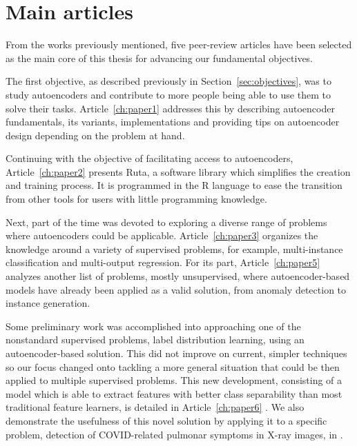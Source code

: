 \clearpage
\section{Main articles}

From the works previously mentioned, five peer-review articles have been selected as the main core of this thesis for advancing our fundamental objectives.

The first objective, as described previously in Section~\ref{sec:objectives}, was to study autoencoders and contribute to more people being able to use them to solve their tasks. Article~\ref{ch:paper1}  addresses this by describing autoencoder fundamentals, its variants, implementations and providing tips on autoencoder design depending on the problem at hand.

Continuing with the objective of facilitating access to autoencoders, Article~\ref{ch:paper2}  presents Ruta, a software library which simplifies the creation and training process. It is programmed in the R language to ease the transition from other tools for users with little programming knowledge.

Next, part of the time was devoted to exploring a diverse range of problems where autoencoders could be applicable. Article~\ref{ch:paper3}  organizes the knowledge around a variety of supervised problems, for example, multi-instance classification and multi-output regression. For its part, Article~\ref{ch:paper5}  analyzes another list of problems, mostly unsupervised, where autoencoder-based models have already been applied as a valid solution, from anomaly detection to instance generation.

Some preliminary work was accomplished into approaching one of the nonstandard supervised problems, label distribution learning, using an autoencoder-based solution. This did not improve on current, simpler techniques so our focus changed onto tackling a more general situation that could be then applied to multiple supervised problems. This new development, consisting of a model which is able to extract features with better class separability than most traditional feature learners, is detailed in Article~\ref{ch:paper6} . We also demonstrate the usefulness of this novel solution by applying it to a specific problem, detection of COVID-related pulmonar symptoms in X-ray images, in .
